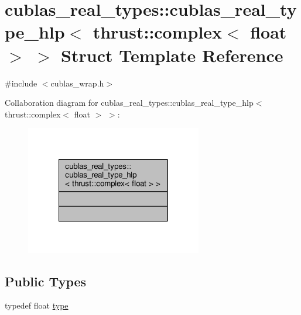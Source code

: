 \hypertarget{structcublas__real__types_1_1cublas__real__type__hlp_3_01thrust_1_1complex_3_01float_01_4_01_4}{\section{cublas\-\_\-real\-\_\-types\-:\-:cublas\-\_\-real\-\_\-type\-\_\-hlp$<$ thrust\-:\-:complex$<$ float $>$ $>$ Struct Template Reference}
\label{structcublas__real__types_1_1cublas__real__type__hlp_3_01thrust_1_1complex_3_01float_01_4_01_4}
}


{\ttfamily \#include $<$cublas\-\_\-wrap.\-h$>$}



Collaboration diagram for cublas\-\_\-real\-\_\-types\-:\-:cublas\-\_\-real\-\_\-type\-\_\-hlp$<$ thrust\-:\-:complex$<$ float $>$ $>$\-:
\nopagebreak
\begin{figure}[H]
\begin{center}
\leavevmode
\includegraphics[width=218pt]{structcublas__real__types_1_1cublas__real__type__hlp_3_01thrust_1_1complex_3_01float_01_4_01_4__coll__graph}
\end{center}
\end{figure}
\subsection*{Public Types}
\begin{DoxyCompactItemize}
\item 
typedef float \hyperlink{structcublas__real__types_1_1cublas__real__type__hlp_3_01thrust_1_1complex_3_01float_01_4_01_4_a4df7173816b8077f524b4eabfafdc50d}{type}
\end{DoxyCompactItemize}


